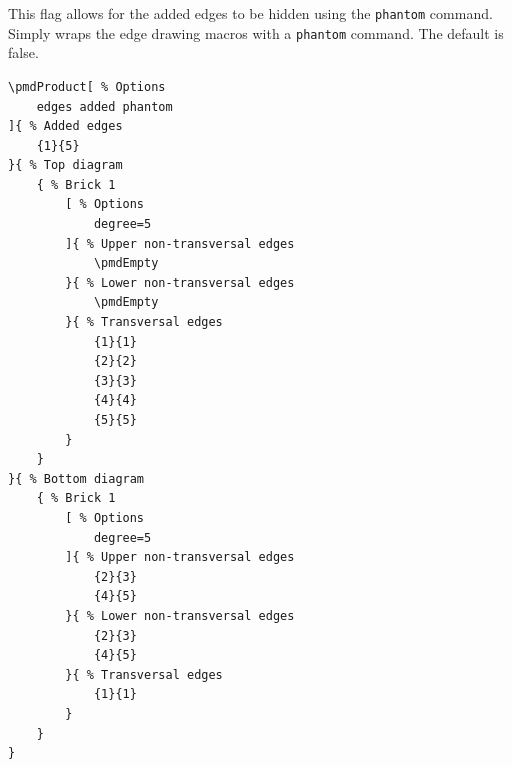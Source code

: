 \documentclass{ltxdoc}
\begin{document}
This flag allows for the added edges to be hidden using the \texttt{phantom} command. Simply wraps the edge drawing macros with a \texttt{phantom} command. The default is false.
\begin{center}
    \begin{minipage}{\dimexpr0.85\textwidth-2\fboxrule-2\fboxsep\relax}
        \begin{minipage}[c]{0.4\linewidth}
\begin{verbatim}
\pmdProduct[ % Options
    edges added phantom
]{ % Added edges
    {1}{5}
}{ % Top diagram
    { % Brick 1
        [ % Options
            degree=5
        ]{ % Upper non-transversal edges
            \pmdEmpty
        }{ % Lower non-transversal edges
            \pmdEmpty
        }{ % Transversal edges
            {1}{1}
            {2}{2}
            {3}{3}
            {4}{4}
            {5}{5}
        }
    }
}{ % Bottom diagram
    { % Brick 1
        [ % Options
            degree=5
        ]{ % Upper non-transversal edges
            {2}{3}
            {4}{5}
        }{ % Lower non-transversal edges
            {2}{3}
            {4}{5}
        }{ % Transversal edges
            {1}{1}
        }
    }
}
\end{verbatim}
        \end{minipage}
        \hfill
        \begin{minipage}[c]{0.4\linewidth}
        \end{minipage}
    \end{minipage}%
\end{center}
\begin{center}
\end{center}
\end{document}
